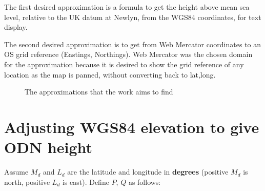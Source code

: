 \documentclass[10pt,a4paper]{article}
\begin{document}
The first desired approximation is a formula to get the height above mean sea
level, relative to the UK datum at Newlyn, from the WGS84 coordinates, for text
display.

The second desired approximation is to get from Web Mercator coordinates to an
OS grid reference (Eastings, Northings).  Web Mercator was the chosen domain
for the approximation because it is desired to show the grid reference of any
location as the map is panned, without converting back to lat,long.

\begin{figure}[htbp]
  \hrulefill

  \centering
{}
\caption{The approximations that the work aims to find}
\label{fig:aims}

  \hrulefill
\end{figure}

\section {Adjusting WGS84 elevation to give ODN height}
Assume $M_d$ and $L_d$ are the latitude and longitude in \textbf{degrees}
(positive $M_d$ is north, positive $L_d$ is east).  Define $P$, $Q$ as follows:
\end{document}
